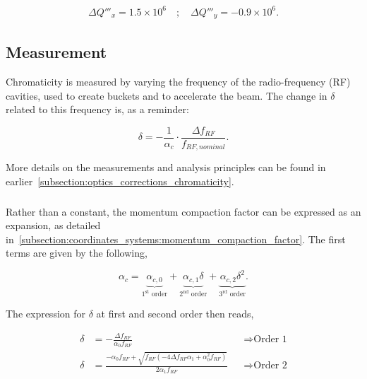 \begin{equation}
    \begin{aligned}
        \Delta Q'''_x =  1.5 \times 10^6 \quad;\quad
        \Delta Q'''_y = -0.9 \times 10^6.
    \end{aligned}
\end{equation}




\subsection{Measurement}
\label{subsection:decapoles:chromaticity:measurement}

Chromaticity is measured by varying the frequency of the radio-frequency (RF) cavities, used to
create buckets and to accelerate the beam. The change in $\delta$ related to this frequency is, as a
reminder:

\begin{equation}
    \delta = - \frac{1}{\alpha_c} \cdot \frac{\Delta f_{RF}}{f_{RF,nominal}}.
\end{equation}

More details on the measurements and analysis principles can be found in
earlier~\cref{subsection:optics_corrections_chromaticity}.



\subsubsection{}
\label{subsubsection:momentum_compaction_factor_studies}

Rather than a constant, the momentum compaction factor can be expressed as an
expansion, as detailed in~\cref{subsection:coordinates_systems:momentum_compaction_factor}.
The first terms are given by the following,

\begin{equation}
    \alpha_c = 
    \underbrace{\alpha_{c,0}}_{1^\text{st} \text{ order}}
    + \underbrace{\alpha_{c,1} \delta}_{2^\text{nd} \text{ order}}
    + \underbrace{\alpha_{c,2} \delta^2}_{3^\text{rd} \text{ order}}.
\end{equation}

The expression for $\delta$ at first and second order then reads,

\begin{equation}
    \begin{aligned}
        \delta &= -\frac{\Delta f_{RF}}{\alpha_{0} f_{RF}} && \Rightarrow \text{Order 1} \\
        \delta &= \frac{- \alpha_{0} f_{RF} + \sqrt{f_{RF} 
            \left(- 4 \Delta f_{RF} \alpha_{1} + \alpha_{0}^{2} f_{RF}\right)}}{2 \alpha_{1} f_{RF}}
            && \Rightarrow \text{Order 2} 
    \end{aligned}
\end{equation}

